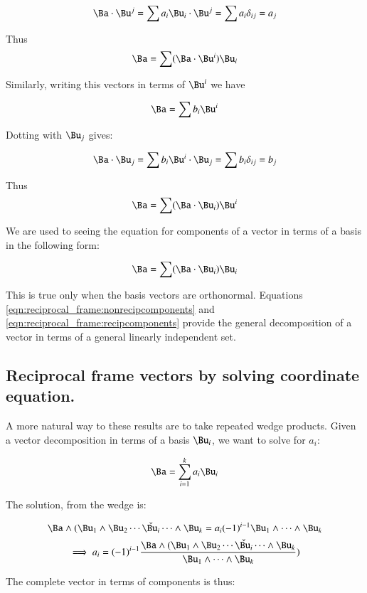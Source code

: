 \[
\Ba \cdot \Bu^j 
= \sum a_i \Bu_i \cdot \Bu^j
= \sum a_i \delta_{ij}
= a_j
\]

Thus
\begin{equation}\label{eqn:reciprocal_frame:nonrecipcomponents}
\Ba = \sum (\Ba \cdot \Bu^i) \Bu_i
\end{equation}

Similarly, writing this vectors in terms of $\Bu^i$ we have

\[
\Ba = \sum b_i \Bu^i
\]

Dotting with $\Bu_j$ gives:

\[
\Ba \cdot \Bu_j 
= \sum b_i \Bu^i \cdot \Bu_j
= \sum b_i \delta_{ij}
= b_j
\]

Thus
\begin{equation}\label{eqn:reciprocal_frame:recipcomponents}
\Ba = \sum (\Ba \cdot \Bu_i) \Bu^i
\end{equation}

We are used to seeing the equation for components of a vector in terms of a
basis in the following form: 

\begin{equation}
\Ba = \sum (\Ba \cdot \Bu_i) \Bu_i
\end{equation}

This is true only when the basis vectors are orthonormal.
Equations
\ref{eqn:reciprocal_frame:nonrecipcomponents} and \ref{eqn:reciprocal_frame:recipcomponents} provide the
general decomposition of a vector in terms of a general linearly independent
set.

\subsection{Reciprocal frame vectors by solving coordinate equation. }

A more natural way to these results are to take repeated wedge products.
Given a vector decomposition in terms of a basis ${\Bu_i}$, we want to solve for $a_i$:

\[
\Ba = \sum_{i=1}^k a_i \Bu_i
\]

The solution, from the wedge is:

\[
\Ba \wedge (\Bu_1 \wedge \Bu_2 \cdots \check{\Bu_i} \cdots \wedge \Bu_k  = a_i (-1)^{i-1} \Bu_1 \wedge \cdots \wedge \Bu_k
\]
\[
\implies
a_i = 
(-1)^{i-1} 
\frac{\Ba \wedge (\Bu_1 \wedge \Bu_2 \cdots \check{\Bu_i} \cdots \wedge \Bu_k}{ \Bu_1 \wedge \cdots \wedge \Bu_k })
\]

The complete vector in terms of components is thus:

